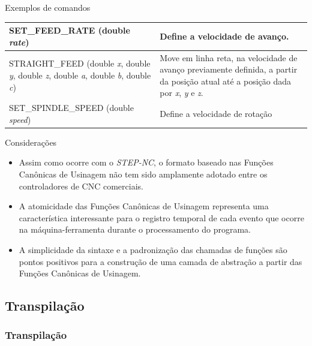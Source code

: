 \documentclass[aspectratio=169]{beamer}
\begin{document}
{\begin{frame}{Exemplos de comandos}
\begin{table}[H]
\begin{tabular}{p{7cm}|p{5cm}}
      \hline  
      \scriptsize{SET\_FEED\_RATE (double \emph{rate})}
      & \scriptsize{Define a velocidade de avan\c co.} \\

      \hline  
      \scriptsize{STRAIGHT\_FEED (double \emph{x}, double \emph{y}, double \emph{z}, 
      double \emph{a}, double \emph{b}, double \emph{c})} 
      & \scriptsize{Move em linha reta, na velocidade de avan\c co previamente definida, 
      a partir da posi\c c\~ao atual at\'e a 
      posi\c c\~ao dada por \emph{x}, \emph{y} e \emph{z}.} \\

      \hline  
      \scriptsize{SET\_SPINDLE\_SPEED (double \emph{speed})} 
      & \scriptsize{Define a velocidade de rotação} \\

      \hline

    \end{tabular}
  \end{table}
\end{frame}


\begin{frame}{Considerações}

  \begin{itemize}
    \item Assim como ocorre com o \emph{STEP-NC}, o formato baseado nas 
          Funções Canônicas de Usinagem não tem sido amplamente adotado 
          entre os controladores de CNC comerciais.
    \item A atomicidade das Funções Canônicas de Usinagem representa uma 
          característica interessante para o registro temporal de cada 
          evento que ocorre na máquina-ferramenta durante o processamento 
          do programa.
    \item A simplicidade da sintaxe e a padronização das chamadas de 
          funções são pontos positivos para a construção de uma camada 
          de abstração a partir das Funções Canônicas de Usinagem.
  \end{itemize}

\end{frame}


\subsection{Transpilação}

\begin{frame}
  \frametitle{Transpilação}


\end{frame}}
\end{document}
